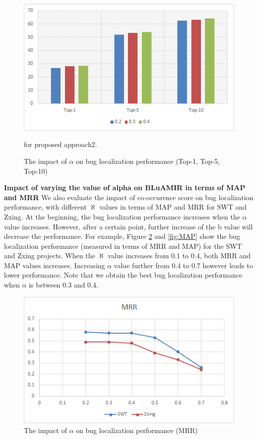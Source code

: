 \documentclass[conference]{IEEEtran}
\begin{document}
\begin{figure}
	\centering
	\includegraphics[scale=0.80]{Performance-vsm+co}
	\caption{The impact of $\alpha$ on bug localization performance (Top-1, Top-5, Top-10)} for proposed approach2.
	\label{fig:PerformanceTopK2}
	\end{figure}


\textbf{Impact of varying the value of alpha on BLuAMIR in terms of MAP and MRR}
We also evaluate the impact of co-occurence score
on bug localization performance, with different $\aleph$ values in terms of MAP and MRR for SWT and Zxing. At the beginning, the bug localization performance increases when the $\alpha$ value increases. However, after a certain point, further increase of the b value will decrease the performance. For example, Figure \ref{fig:MRR} and \ref{fig:MAP} show the bug localization performance (measured in terms of MRR and MAP) for the SWT and Zxing projects. When the $\aleph$ value increases from 0.1 to 0.4, both MRR and MAP values increases. Increasing $\alpha$ value further from 0.4 to 0.7 however leads to lower performance. Note that we obtain the best bug localization performance when $\alpha$ is between 0.3 and 0.4.
\begin{figure}
	\centering
	\includegraphics[scale=0.80]{MRR-SWT-Zxing}
	\caption{The impact of $\alpha$ on bug localization performance (MRR)}
	\label{fig:MRR}
\end{figure}
\end{document}
